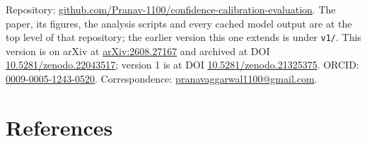 \documentclass[10pt]{article}
\begin{document}
Repository: \href{https://github.com/Pranav-1100/confidence-calibration-evaluation}{github.com/Pranav-1100/confidence-calibration-evaluation}.
The paper, its figures, the analysis scripts and every cached model output are at the top level of
that repository; the earlier version this one extends is under \texttt{v1/}. This version is on arXiv at
\href{https://arxiv.org/abs/2608.27167}{arXiv:2608.27167} and archived at DOI \href{https://doi.org/10.5281/zenodo.22043517}{10.5281/zenodo.22043517}; version 1 is at
DOI \href{https://doi.org/10.5281/zenodo.21325375}{10.5281/zenodo.21325375}.
ORCID: \href{https://orcid.org/0009-0005-1243-0520}{0009-0005-1243-0520}.
Correspondence: \href{mailto:pranavaggarwal1100@gmail.com}{\mbox{pranavaggarwal1100@gmail.com}}.

\FloatBarrier
\section*{References}
\end{document}

